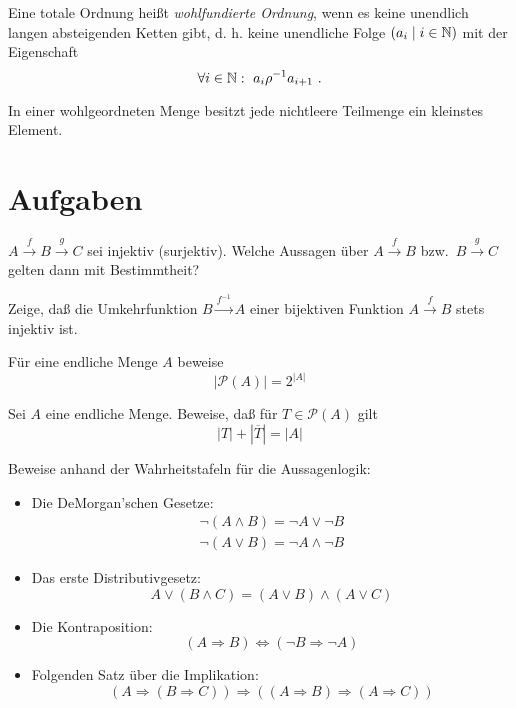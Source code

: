 \begin{definition}
  Eine totale Ordnung heißt \textit{wohlfundierte
    Ordnung}, wenn es keine unendlich langen
  absteigenden Ketten gibt, d. h. keine unendliche Folge $(a_i\mid i\in\mathbb{N})$
  mit der Eigenschaft
  \[\forall i\in\enn:\ a_i\rho^{-1}a_{i+1}\ .\]
\end{definition}
In einer wohlgeordneten Menge besitzt jede
  nichtleere Teilmenge ein kleinstes Element.

\section*{Aufgaben}
\begin{aufgabe}
 $A \stackrel{f}{\rightarrow}B\stackrel{g}{\rightarrow}C$ sei injektiv
   (surjektiv). Welche Aussagen über $A\stackrel{f}{\rightarrow}B$ bzw.\ 
   $B\stackrel{g}{\rightarrow}C$ gelten dann mit Bestimmtheit?
\end{aufgabe}

\begin{aufgabe} 
   Zeige, daß die Umkehrfunktion $B \stackrel{f^{-1}}{\longrightarrow}
   A$ einer bijektiven Funktion $A \stackrel{f}{\rightarrow} B$ stets
   injektiv ist.
\end{aufgabe}

\begin{aufgabe}
        Für eine endliche Menge $A$ beweise
        \[|\mathcal{P}(A)| = 2^{|A|}\]
\end{aufgabe}

\begin{aufgabe}
        Sei $A$ eine endliche Menge. Beweise, daß für $T\in\mathcal{P}(A)$
        gilt
\[|T| + |\overline T| = |A|\]
\end{aufgabe}

\begin{aufgabe}
  Beweise anhand der Wahrheitstafeln für die Aussagenlogik:
  \begin{itemize}
  \item Die DeMorgan'schen Gesetze:
    \begin{eqnarray*}
      \neg(A\wedge B) = \neg A \vee \neg B\\
      \neg(A\vee B) = \neg A \wedge \neg B
    \end{eqnarray*}
  \item Das erste Distributivgesetz:
    \begin{displaymath}
      A\vee(B\wedge C) = (A\vee B)\wedge (A\vee C)
    \end{displaymath}
  \item Die Kontraposition:
    \begin{displaymath}
      (A\Rightarrow B) \Leftrightarrow (\neg B\Rightarrow \neg A)
    \end{displaymath}
  \item Folgenden Satz über die Implikation:
    \begin{displaymath}
    (A\Rightarrow (B\Rightarrow C))\Rightarrow((A\Rightarrow
      B)\Rightarrow (A\Rightarrow C))
    \end{displaymath}
  \end{itemize}
\end{aufgabe}

